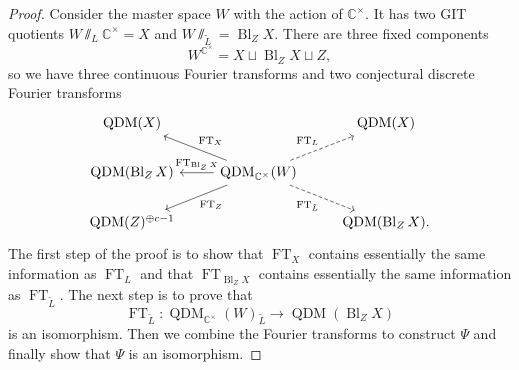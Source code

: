 \documentclass{amsart}
\theoremstyle{definition}
\theoremstyle{remark}
\theoremstyle{plain}
\theoremstyle{definition}
\theoremstyle{remark}
\newcommand{\C}{\mathbb{C}}
\newcommand{\1}{\mathbf{1}}
\newcommand{\2}{\mathbf{2}}
\newcommand{\3}{\mathbf{3}}
\DeclareMathOperator{\Bl}{Bl}
\DeclareMathOperator{\QDM}{QDM}
\DeclareMathOperator{\FT}{FT}
\begin{document}
\begin{proof}
    Consider the master space \(W\) with the action of \(\C^{\times}\). It has two GIT quotients \(W \sslash_L \C^{\times} = X\) and \(W \sslash_{\tilde{L}} = \Bl_Z X\). There are three fixed components
    \[ W^{\C^{\times}} = X \sqcup \Bl_Z X \sqcup Z, \]
    so we have three continuous Fourier transforms and two conjectural discrete Fourier transforms
    \begin{equation*}
    \begin{tikzcd}
        \QDM(X) & & \QDM(X)\\
        \QDM(\Bl_Z X) & \QDM_{\C^{\times}}(W) \ar{l}[swap]{\FT_{\Bl_Z X}} \ar{ul}[swap]{\FT_X} \ar{dl}{\FT_Z} \ar[dashrightarrow]{ur}{\FT_L} \ar[dashrightarrow]{dr}[swap]{\FT_{\tilde{L}}} \\
        \QDM(Z)^{\oplus c-1} & & \QDM(\Bl_Z X).
    \end{tikzcd}
    \end{equation*}
    The first step of the proof is to show that \(\FT_X\) contains essentially the same information as \(\FT_L\) and that \(\FT_{\Bl_Z X}\) contains essentially the same information as \(\FT_{\tilde{L}}\). The next step is to prove that
    \[ \FT_{\tilde{L}} \colon \QDM_{\C^{\times}}(W)_{\tilde{L}} \to \QDM(\Bl_Z X) \]
    is an isomorphism. Then we combine the Fourier transforms to construct \(\Psi\) and finally show that \(\Psi\) is an isomorphism.
\end{proof}
\end{document}
